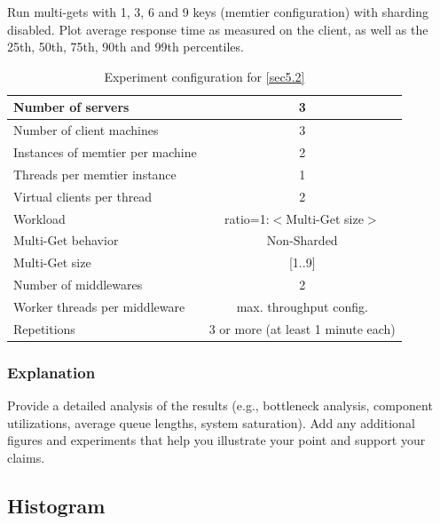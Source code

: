 \documentclass[11pt,a4paper]{article}
\begin{document}
Run multi-gets with 1, 3, 6 and 9 keys (memtier configuration) with sharding disabled. Plot average response time as measured on the client, as well as the 25th, 50th, 75th, 90th and 99th percentiles.

\begin{center}
    \begin{table}
		\begin{tabular}{|l|c|}
			\hline Number of servers                & 3                       \\ 
			\hline Number of client machines        & 3                       \\ 
			\hline Instances of memtier per machine & 2                       \\ 
			\hline Threads per memtier instance     & 1                       \\
			\hline Virtual clients per thread       & 2                		 \\ 
			\hline Workload                         & ratio=1:$<$Multi-Get size$>$              \\
			\hline Multi-Get behavior               & Non-Sharded             \\
			\hline Multi-Get size                   & [1..9]                  \\
			\hline Number of middlewares            & 2                       \\
			\hline Worker threads per middleware    & max. throughput config. \\
			\hline Repetitions                      & 3 or more (at least 1 minute each)               \\ 
			\hline 
		\end{tabular}
		\caption{Experiment configuration for \autoref{sec5.2}} \label{exp5-2}
	\end{table}
\end{center}

\subsubsection{Explanation}

Provide a detailed analysis of the results (e.g., bottleneck analysis, component utilizations, average queue lengths, system saturation). Add any additional figures and experiments that help you illustrate your point and support your claims.

\subsection{Histogram}
\end{document}
